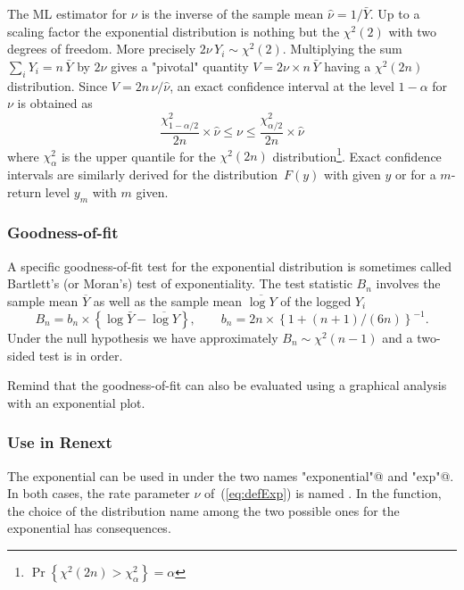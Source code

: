 \documentclass[a4paper]{report}
\begin{document}
The  ML estimator for $\nu$ is the inverse of the sample mean
$\widehat{\nu}=1/\bar{Y}$. Up to a scaling factor the exponential distribution 
is nothing but the $\chi^2(2)$ with two degrees of freedom. More precisely
$2 \nu\, Y_i \sim \chi^2(2)$. Multiplying the sum $\sum_iY_i= n\,\bar{Y}$ by $2 \nu$ 
gives a "pivotal" quantity $V = 2 \nu \times n\,\bar{Y}$ 
having a $\chi^2(2n)$ distribution. Since $V = 2n\,\nu/\widehat{\nu}$,  
an exact confidence interval at the level $1-\alpha$ for
$\nu$ is obtained as 
$$
     \frac{\chi^2_{1-\alpha/2}}{2n}  \times 
       \widehat{\nu} \leqslant \nu \leqslant 
     \frac{\chi^2_{\alpha/2}}{2n} \times  \widehat{\nu}
$$
where $\chi^2_\alpha$ is the upper quantile for the $\chi^2(2n)$ 
distribution\footnote{$\Pr\left\{\chi^2(2n)> \chi^2_\alpha \right\} =\alpha$}. 
Exact confidence intervals are similarly derived for the distribution~$F(y)$ with
given $y$ or for a $m$-return level $y_m$ with $m$ given.

\subsubsection*{Goodness-of-fit}
A specific goodness-of-fit test for the exponential distribution is sometimes 
called Bartlett's (or Moran's) test of exponentiality.
%
The  test statistic $B_n$ involves the sample mean $\overline{Y}$ as well as 
the sample mean $\overline{\log Y}$ of the logged $Y_i$
$$
     B_n = b_n \times \left\{\log \bar{Y} - \overline{\log Y} \right\},
     \qquad b_n = 2n \times  \left\{1+ (n+1)/(6n) \right\}^{-1}.
$$
Under the null hypothesis we have approximately  $B_n \sim \chi^2(n-1)$ and 
a two-sided test is in order.

Remind that the goodness-of-fit can also be evaluated using a graphical 
analysis with an exponential plot. 
%

\subsubsection*{Use in Renext}
The exponential can be used in \verb@Renouv@ under the two names
\verb@"exponential"@ and \verb@"exp"@. In both cases, 
the rate parameter $\nu$ of~(\ref{eq:defExp}) is named \verb@rate@.
In the \verb@Renouv@ function, the choice of the distribution name 
among the two possible ones for the exponential has consequences. 
\end{document}
